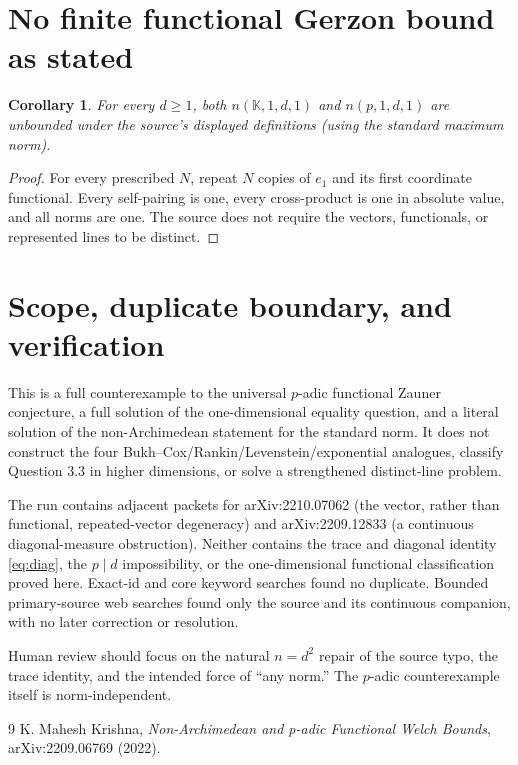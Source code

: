 \documentclass[11pt]{article}
\newtheorem{corollary}{Corollary}
\newcommand{\K}{\mathbb K}
\begin{document}
\section*{No finite functional Gerzon bound as stated}

\begin{corollary}
For every \(d\geq1\), both
\(n(\K,1,d,1)\) and \(n(p,1,d,1)\) are unbounded under the source's
displayed definitions (using the standard maximum norm).
\end{corollary}

\begin{proof}
For every prescribed \(N\), repeat \(N\) copies of \(e_1\) and its first
coordinate functional.  Every self-pairing is one, every cross-product is
one in absolute value, and all norms are one.  The source does not require
the vectors, functionals, or represented lines to be distinct.
\end{proof}

\section*{Scope, duplicate boundary, and verification}

This is a full counterexample to the universal \(p\)-adic functional Zauner
conjecture, a full solution of the one-dimensional equality question, and a
literal solution of the non-Archimedean statement for the standard norm.  It
does not construct the four Bukh--Cox/Rankin/Levenstein/exponential analogues,
classify Question 3.3 in higher dimensions, or solve a strengthened
distinct-line problem.

The run contains adjacent packets for arXiv:2210.07062 (the vector, rather
than functional, repeated-vector degeneracy) and arXiv:2209.12833 (a
continuous diagonal-measure obstruction).  Neither contains the trace and
diagonal identity \eqref{eq:diag}, the \(p\mid d\) impossibility, or the
one-dimensional functional classification proved here.  Exact-id and core
keyword searches found no duplicate.  Bounded primary-source web searches
found only the source and its continuous companion, with no later correction
or resolution.

Human review should focus on the natural \(n=d^2\) repair of the source typo,
the trace identity, and the intended force of ``any norm.''  The \(p\)-adic
counterexample itself is norm-independent.

\begin{thebibliography}{9}
K. Mahesh Krishna, \emph{Non-Archimedean and p-adic Functional Welch Bounds},
arXiv:2209.06769 (2022).
\end{thebibliography}
\end{document}
